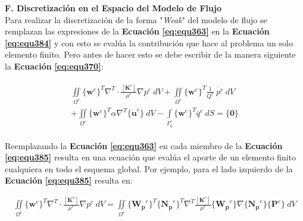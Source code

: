 \bigskip\bigskip
\textbf{F. Discretización en el Espacio del Modelo de Flujo}\\
Para realizar la discretización de la forma "\textit{Weak}" del modelo de flujo se remplazan las expresiones de la \textbf{Ecuación} \textbf{\ref{eq:equ363}} en la \textbf{Ecuación} \textbf{\ref{eq:equ384}} y con esto se evalúa la contribución que hace al problema un solo elemento finito. Pero antes de hacer esto se debe escribir de la manera siguiente la \textbf{Ecuación} \textbf{\ref{eq:equ370}}:\bigskip

\begin{ceqn} 
\begin{gather}\label{eq:equ385}
\begin{multlined}
\iint \limits_{\Omega^e} \{\mathbf{w}^e\}^T \nabla^T \cdot \frac{[\mathbf{K}^e]}{\mu^e}\nabla p^e\ dV + \iint \limits_{\Omega^e} \{\mathbf{w}^e\}^T \frac{1}{Q^e}\ \dot{p^e}\ dV \\[8pt]
+ \iint \limits_{\Omega^e}\{\mathbf{w}^e\}^T \alpha \nabla^T \{\mathbf{\dot{u}}^e\}\ dV -
\int \limits_{\Gamma_{q}^e} \{\mathbf{w}^e\}^T \overline{q}^e\ dS = \{\mathbf{0}\}
\end{multlined}
\end{gather}  
\end{ceqn}


Reemplazando la \textbf{Ecuación} \textbf{\ref{eq:equ363}} en cada miembro de la \textbf{Ecuación} \textbf{\ref{eq:equ385}} resulta en una ecuación que evalúa el aporte de un elemento finito cualquiera en todo el esquema global. Por ejemplo, para el lado izquierdo de la \textbf{Ecuación} \textbf{\ref{eq:equ385}} resulta en:\bigskip


\begin{ceqn} %
\begin{gather}\label{eq:equ386}
\iint \limits_{\Omega^e} \{\mathbf{w}^e\}^T \nabla^T \cdot \frac{[\mathbf{K}^e]}{\mu^e} \nabla p^e\ dV = 
\iint \limits_{\Omega^e} \{\mathbf{W_p}^e\}^T \{\mathbf{N_p}^e\}^T \nabla^T  \frac{[\mathbf{K}^e]}{\mu^e} \{\mathbf{W_p}^e\} \nabla \{\mathbf{N_p}^e\} \{\mathbf{P}^e\}\ dV
\end{gather}   
\end{ceqn}

